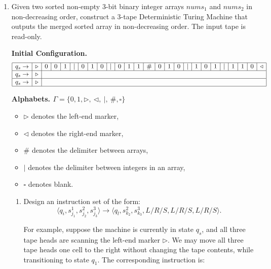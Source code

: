 \documentclass[12pt,a4paper]{article}
\theoremstyle{definition}
\begin{document}
\begin{enumerate}
    \item {\color{purple}{(Turing Machine)}} 
    
    Given two sorted non-empty 3-bit binary integer arrays \(nums_1\) and \(nums_2\) in non-decreasing order, construct a 3-tape Deterministic Turing Machine that outputs the merged sorted array in non-decreasing order. The input tape is read-only.
    
    \textbf{Initial Configuration.}
    \[
        \begin{array}{|*{26}{c|}}
        \hline
        q_s \rightarrow & \triangleright & 0 & 0 & 1 & | & 0 & 1 & 0 & | & 0 & 1 & 1 & \# & 0 & 1 & 0 & | & 1 & 0 & 1 & | & 1 & 1 & 0 & \triangleleft \\
        \hline
        q_s \rightarrow & \triangleright & \multicolumn{24}{c|}{} \\
        \hline
        q_s \rightarrow & \triangleright & \multicolumn{24}{c|}{} \\
        \hline
        
        \end{array}
    \]
    

    \textbf{Alphabets. $\Gamma = \{0,1,\triangleright,\ \triangleleft,\ \vert,\ \#, \square\}$}

    \begin{itemize}
        \item \(\triangleright\) denotes the left-end marker,
        \item \(\triangleleft\) denotes the right-end marker,
        \item \(\#\) denotes the delimiter between arrays,
        \item \(\vert\) denotes the delimiter between integers in an array,
        \item \(\square\) denotes blank.
    \end{itemize}

    

    \begin{enumerate}
        \item Design an instruction set of the form:  
        \[
        \langle q_i,s^1_{j_1}, s^2_{j_2}, s^3_{j_3} \rangle \rightarrow \langle q_l,s^2_{k_2}, s^3_{k_3}, L/R/S, L/R/S, L/R/S \rangle.
        \]

        For example, suppose the machine is currently in state $q_s$, and all three tape heads are scanning the left-end marker $\triangleright$. We may move all three tape heads one cell to the right without changing the tape contents, while transitioning to state $q_1$. The corresponding instruction is:


\end{enumerate}
\end{enumerate}
\end{document}
